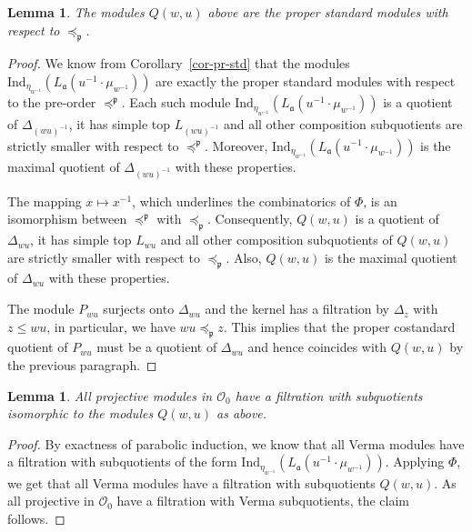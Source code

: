 \documentclass[a4paper]{amsart}
\newtheorem{lemma}[theorem]{Lemma}
\begin{document}
\begin{lemma}\label{lem-s4.4-1}
The modules $Q(w,u)$ above are the proper standard modules with respect to
$\preceq_\mathfrak{p}$.
\end{lemma}

\begin{proof}
We know from Corollary~\ref{cor-pr-std} that the modules 
$\mathrm{Ind}_{\eta_{w^{-1}}}(L_\mathfrak{a}(u^{-1}\cdot \mu_{w^{-1}}))$ 
are exactly the proper standard modules with respect to the pre-order
$\preceq^\mathfrak{p}$. Each such module
$\mathrm{Ind}_{\eta_{w^{-1}}}(L_\mathfrak{a}(u^{-1}\cdot \mu_{w^{-1}}))$
is a quotient of $\Delta_{(wu)^{-1}}$, it has simple top
$L_{(wu)^{-1}}$ and all other 
composition subquotients are strictly smaller
with respect to $\preceq^\mathfrak{p}$. Moreover,
$\mathrm{Ind}_{\eta_{w^{-1}}}(L_\mathfrak{a}(u^{-1}\cdot \mu_{w^{-1}}))$
is the maximal quotient of $\Delta_{(wu)^{-1}}$ with these
properties.

The mapping $x\mapsto x^{-1}$, which underlines the combinatorics of 
$\Phi$, is an isomorphism between $\preceq^\mathfrak{p}$ with
$\preceq_\mathfrak{p}$. Consequently, $Q(w,u)$ is a quotient of
$\Delta_{wu}$, it has simple top $L_{wu}$ and all other 
composition subquotients of $Q(w,u)$ are strictly smaller
with respect to $\preceq_\mathfrak{p}$. Also, $Q(w,u)$ is
the maximal quotient of $\Delta_{wu}$ with these properties.

The module $P_{wu}$ surjects onto $\Delta_{wu}$ and the kernel has
a filtration by $\Delta_z$ with $z\leq wu$, in particular, we have
$wu\preceq_\mathfrak{p}z$. This implies that the proper costandard
quotient of $P_{wu}$ must be a quotient of $\Delta_{wu}$ and hence
coincides with $Q(w,u)$ by the previous paragraph.
\end{proof}

\begin{lemma}\label{lem-s4.4-2}
All projective modules in $\mathcal{O}_0$ have a filtration
with subquotients isomorphic to the modules $Q(w,u)$ as above.
\end{lemma}

\begin{proof}
By exactness of parabolic induction, we know that all Verma modules
have a filtration with subquotients of the form 
$\mathrm{Ind}_{\eta_{w^{-1}}}(L_\mathfrak{a}(u^{-1}\cdot \mu_{w^{-1}}))$.
Applying $\Phi$, we get that all Verma modules have a filtration 
with subquotients $Q(w,u)$. As all projective in 
$\mathcal{O}_0$ have a filtration with Verma subquotients,
the claim follows.
\end{proof}
\end{document}
